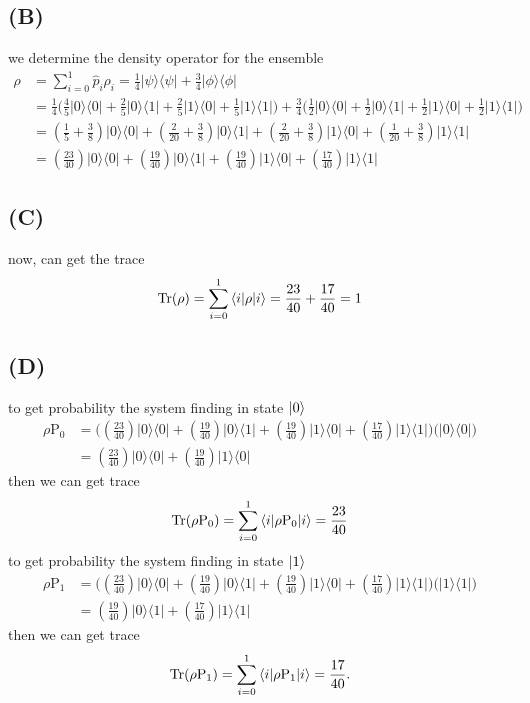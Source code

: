 \documentclass{article}
\newcommand{\op}[2]{|#1\rangle \langle#2|}
\newcommand{\sand}[3]{\braket{#1 | #2 | #3}}
\begin{document}
\subsection*{(B)}
we determine the density operator for the ensemble
\begin{align*}
    \rho &= \sum_{i=0}^{1} \hat{p}_{i} \rho_{i} =  \frac{1}{4}\op{\psi}{\psi} + \frac{3}{4}\op{\phi}{\phi} \\
    &= \frac{1}{4}\big(\frac{4}{5}\op{0}{0} + \frac{2}{5}\op{0}{1} + \frac{2}{5}\op{1}{0} + \frac{1}{5}\op{1}{1}\big) + \frac{3}{4}\big(\frac{1}{2}\op{0}{0} + \frac{1}{2}\op{0}{1} + \frac{1}{2}\op{1}{0} + \frac{1}{2}\op{1}{1}\big) \\
    &= (\frac{1}{5} + \frac{3}{8})\op{0}{0} + (\frac{2}{20} + \frac{3}{8})\op{0}{1} + (\frac{2}{20} + \frac{3}{8})\op{1}{0} + (\frac{1}{20} + \frac{3}{8})\op{1}{1} \\
    &= (\frac{23}{40})\op{0}{0} + (\frac{19}{40})\op{0}{1} + (\frac{19}{40})\op{1}{0} + (\frac{17}{40})\op{1}{1} 
\end{align*}
\subsection*{(C)}
now, can get the trace
\begin{align*}
    \text{Tr}(\rho) = \sum_{i=0}^{1} \sand{i}{\rho}{i} = \frac{23}{40} + \frac{17}{40} = 1
\end{align*}
\subsection*{(D)}
to get probability the system finding in state $\ket{0}$
\begin{align*}
    \rho\text{P}_{0} &= \big((\frac{23}{40})\op{0}{0} + (\frac{19}{40})\op{0}{1} + (\frac{19}{40})\op{1}{0} + (\frac{17}{40})\op{1}{1}\big)\big(\op{0}{0}\big) \\
    &= (\frac{23}{40})\op{0}{0} + (\frac{19}{40})\op{1}{0}
\end{align*}
then we can get trace 
\begin{align*}
    \text{Tr}(\rho\text{P}_{0}) = \sum_{i=0}^{1} \sand{i}{\rho\text{P}_{0}}{i} = \frac{23}{40}
\end{align*}
to get probability the system finding in state $\ket{1}$
\begin{align*}
    \rho\text{P}_{1} &= \big((\frac{23}{40})\op{0}{0} + (\frac{19}{40})\op{0}{1} + (\frac{19}{40})\op{1}{0} + (\frac{17}{40})\op{1}{1}\big)\big(\op{1}{1}\big) \\
    &= (\frac{19}{40})\op{0}{1} + (\frac{17}{40})\op{1}{1}
\end{align*}
then we can get trace 
\begin{align*}
    \text{Tr}(\rho\text{P}_{1}) = \sum_{i=0}^{1} \sand{i}{\rho\text{P}_{1}}{i} = \frac{17}{40}.
\end{align*}
\end{document}
